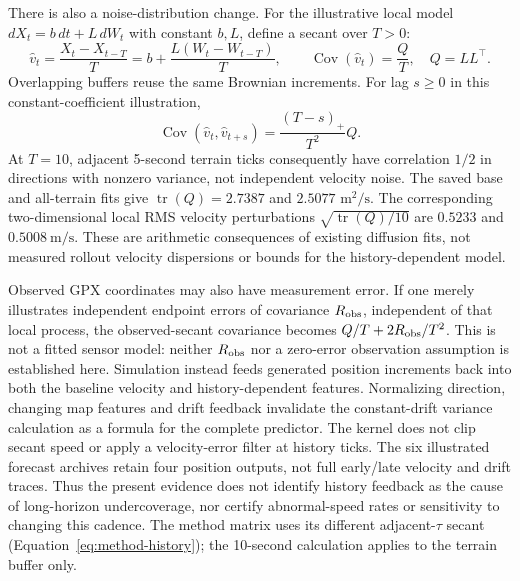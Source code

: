 \documentclass[11pt]{article}
\begin{document}
There is also a noise-distribution change. For the illustrative local model
\(dX_t=b\,dt+L\,dW_t\) with constant \(b,L\), define a secant over \(T>0\):
\begin{equation}
 \widehat v_t=\frac{X_t-X_{t-T}}{T}
       =b+\frac{L(W_t-W_{t-T})}{T},\qquad
 \operatorname{Cov}(\widehat v_t)=\frac{Q}{T},
 \quad Q=LL^\top .
 \label{eq:secant-local-noise}
\end{equation}
Overlapping buffers reuse the same Brownian increments. For lag \(s\ge0\)
in this constant-coefficient illustration,
\begin{equation}
 \operatorname{Cov}(\widehat v_t,\widehat v_{t+s})
       =\frac{(T-s)_+}{T^2}Q .
 \label{eq:secant-overlap}
\end{equation}
At \(T=10\), adjacent 5-second terrain ticks consequently have correlation
\(1/2\) in directions with nonzero variance, not independent velocity noise. The saved base and
all-terrain fits give \(\operatorname{tr}(Q)=2.7387\) and \(2.5077\)
\(\mathrm{m^2/s}\). The corresponding two-dimensional local RMS velocity
perturbations \(\sqrt{\operatorname{tr}(Q)/10}\) are \(0.5233\) and
\(0.5008\ \mathrm{m/s}\). These are arithmetic consequences of existing
diffusion fits, not measured rollout velocity dispersions or bounds for
the history-dependent model.

Observed GPX coordinates may also have measurement error. If one merely
illustrates independent endpoint errors of covariance \(R_{\rm obs}\),
independent of that local process, the observed-secant covariance becomes
\(Q/T+2R_{\rm obs}/T^2\). This is not a fitted sensor model: neither
\(R_{\rm obs}\) nor a zero-error observation assumption is established here.
Simulation instead feeds generated position increments back into both the
baseline velocity and history-dependent features. Normalizing direction,
changing map features and drift feedback invalidate the constant-drift
variance calculation as a formula for the complete predictor. The kernel
does not clip secant speed or apply a velocity-error filter at history ticks.
The six illustrated forecast archives retain four position outputs, not
full early/late velocity and drift traces. Thus the present evidence does
not identify history feedback as the cause of long-horizon undercoverage,
nor certify abnormal-speed rates or sensitivity to changing this cadence.
The method matrix uses its different adjacent-\(\tau\) secant
(Equation~\eqref{eq:method-history}); the 10-second calculation applies
to the terrain buffer only.
\end{document}
